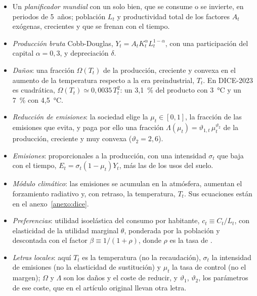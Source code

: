 \documentclass[11pt]{article}
\begin{document}
\begin{itemize}
\item Un \emph{planificador mundial} con un solo bien, que se consume o se invierte, en periodos de 5~años; población $L_t$ y productividad total de los factores $A_t$ exógenas, crecientes y que se frenan con el tiempo.
\item \emph{Producción bruta} Cobb-Douglas, $Y_t=A_tK_t^{\alpha}L_t^{1-\alpha}$, con una participación del capital $\alpha=0{,}3$, y depreciación $\delta$\nocite{BarrageNordhaus2023DICEwp}.
\item \emph{Daños}: una fracción $\Omega(T_t)$ de la producción, creciente y convexa en el aumento de la temperatura respecto a la era preindustrial, $T_t$. En DICE-2023 es cuadrática, $\Omega(T_t)\simeq0{,}0035\,T_t^2$: un 3,1~\% del producto con 3~°C y un 7~\% con 4,5~°C\nocite{BarrageNordhaus2024DICE}.
\item \emph{Reducción de emisiones}: la sociedad elige la  $\mu_t\in[0,1]$, la fracción de las emisiones que evita, y paga por ello una fracción $\Lambda(\mu_t)=\vartheta_{1,t}\,\mu_t^{\vartheta_2}$ de la producción, creciente y muy convexa ($\vartheta_2=2{,}6$).
\item \emph{Emisiones}: proporcionales a la producción, con una intensidad $\sigma_t$ que baja con el tiempo, $E_t=\sigma_t(1-\mu_t)Y_t$, más las de los usos del suelo.
\item \emph{Módulo climático}: las emisiones se acumulan en la atmósfera, aumentan el forzamiento radiativo y, con retraso, la temperatura, $T_t$. Sus ecuaciones están en el anexo~\ref{anexo:dice}.
\item \emph{Preferencias}: utilidad isoelástica del consumo por habitante, $c_t\equiv C_t/L_t$, con elasticidad de la utilidad marginal $\theta$, ponderada por la población y descontada con el factor $\beta\equiv1/(1+\rho)$, donde $\rho$ es la tasa de .
\item \emph{Letras locales}: aquí $T_t$ es la temperatura (no la recaudación), $\sigma_t$ la intensidad de emisiones (no la elasticidad de sustitución) y $\mu_t$ la tasa de control (no el margen); $\Omega$ y $\Lambda$ son los daños y el coste de reducir, y $\vartheta_1$, $\vartheta_2$, los parámetros de ese coste, que en el artículo original llevan otra letra.
\end{itemize}

\begin{infografia}[H]
\centering
\caption{El modelo DICE: de la producción a las emisiones, el clima y los daños}\label{figu:dice-esquema}
\end{infografia}
\end{document}
